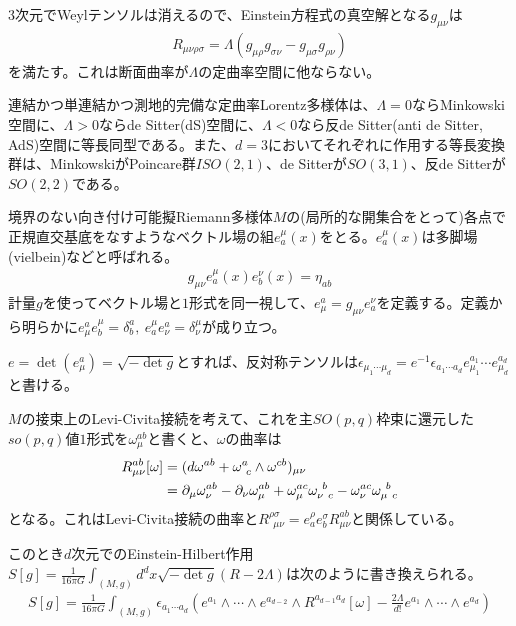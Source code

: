 3次元でWeylテンソルは消えるので、Einstein方程式の真空解となる$g_{\mu\nu}$は
\begin{align}
R_{\mu\nu\rho\sigma}=\Lambda(g_{\mu\rho}g_{\sigma\nu}-g_{\mu\sigma}g_{\rho\nu})
\end{align}
を満たす。これは断面曲率が$\Lambda$の定曲率空間に他ならない。

連結かつ単連結かつ測地的完備な定曲率Lorentz多様体は、$\Lambda=0$ならMinkowski空間に、$\Lambda>0$ならde Sitter(dS)空間に、$\Lambda<0$なら反de Sitter(anti de Sitter, AdS)空間に等長同型である。また、$d=3$においてそれぞれに作用する等長変換群は、MinkowskiがPoincare群$ISO(2,1)$、de Sitterが$SO(3,1)$、反de Sitterが$SO(2,2)$である。

境界のない向き付け可能擬Riemann多様体$M$の(局所的な開集合をとって)各点で正規直交基底をなすようなベクトル場の組${e_a^\mu(x)}$をとる。${e_a^\mu(x)}$は多脚場(vielbein)などと呼ばれる。
\begin{align}
g_{\mu\nu}e_a^\mu(x)e_b^\nu(x)=\eta_{ab}
\end{align}
計量$g$を使ってベクトル場と$1$形式を同一視して、$e_\mu^a=g_{\mu\nu}e_a^\nu$を定義する。定義から明らかに$e_\mu^a e_b^\mu=\delta_b^a,\ e_a^\mu e_\nu^a=\delta_\nu^\mu$が成り立つ。

$e=\det(e_\mu^a)=\sqrt{-\det g}$とすれば、反対称テンソルは$\epsilon_{\mu_1\cdots \mu_d}=e^{-1}\epsilon_{a_1\cdots a_d}e_{\mu_1}^{a_1} \cdots e_{\mu_d}^{a_d}$と書ける。

$M$の接束上のLevi-Civita接続を考えて、これを主$SO(p,q)$枠束に還元した$so(p,q)$値$1$形式を$\omega_\mu^{ab}$と書くと、$\omega$の曲率は
\begin{align}
R_{\mu\nu}^{ab}[\omega]&=(d\omega^{ab}+\omega^a_{\ c}\wedge\omega^{cb})_{\mu\nu}\notag\\
&=\del_\mu \omega_\nu^{ab}-\del_\nu \omega_\mu^{ab}+\omega_\mu^{ac}\omega_{\nu\ c}^{\ b}-\omega_\nu^{ac}\omega_{\mu\ c}^{\ b}
\end{align}
となる。これはLevi-Civita接続の曲率と$R_{\ \ \mu\nu}^{\rho\sigma}=e_a^\rho e_b^\sigma R_{\mu\nu}^{ab}$と関係している。

このとき$d$次元でのEinstein-Hilbert作用$S[g]=\frac{1}{16\pi G}\int_{(M,g)}d^d x \sqrt{-\det{g}}(R-2\Lambda)$は次のように書き換えられる。
\begin{align}
S[g]=\frac{1}{16\pi G}\int_{(M,g)} \epsilon_{a_1\cdots a_d}(e^{a_1}\wedge\cdots\wedge e^{a_{d-2}}\wedge R^{a_{d-1}a_d}[\omega]-\frac{2\Lambda}{d!}e^{a_1}\wedge\cdots\wedge e^{a_d})
\end{align}

